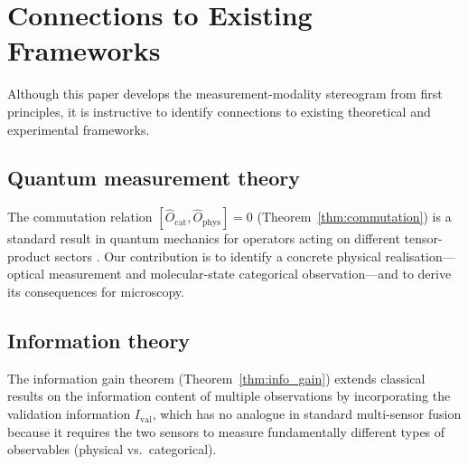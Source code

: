 \documentclass[11pt,twocolumn,a4paper]{article}
\newcommand{\Ocat}{\hat{O}_{\mathrm{cat}}}
\newcommand{\Ophys}{\hat{O}_{\mathrm{phys}}}
\begin{document}



\section{Connections to Existing Frameworks}\label{sec:connections}

Although this paper develops the measurement-modality stereogram from first principles, it is instructive to identify connections to existing theoretical and experimental frameworks.

\subsection{Quantum measurement theory}

The commutation relation $[\Ocat, \Ophys] = 0$ (Theorem~\ref{thm:commutation}) is a standard result in quantum mechanics for operators acting on different tensor-product sectors \citep{vonNeumann1932,Sakurai2020}.
Our contribution is to identify a concrete physical realisation---optical measurement and molecular-state categorical observation---and to derive its consequences for microscopy.

\subsection{Information theory}

The information gain theorem (Theorem~\ref{thm:info_gain}) extends classical results on the information content of multiple observations \citep{Shannon1948,CoverThomas2006} by incorporating the validation information $I_{\mathrm{val}}$, which has no analogue in standard multi-sensor fusion because it requires the two sensors to measure fundamentally different types of observables (physical vs.\ categorical).
\end{document}
